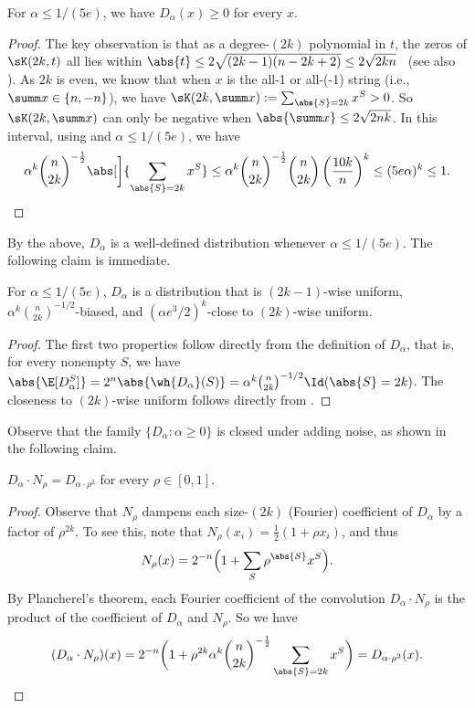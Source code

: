 \begin{claim} \label{claim:krawtchouk-even}
For $\alpha \le 1/(5e)$, we have $D_\alpha(x) \ge 0$ for every $x$.
\end{claim}

\begin{proof}
The key observation is that as a degree-$(2k)$ polynomial in $t$, the zeros of $\sK(2k, t)$ all lies within $\abs{t} \le 2\sqrt{(2k-1) (n-2k+2)} \le 2\sqrt{2kn}$~\cite{Levenshtein95} (see also \cite[Section~5]{KL01}).
As $2k$ is even, we know that when $x$ is the all-1 or all-(-1) string (i.e., $\summ x \in \{n,-n\}$), we have $\sK(2k, \summ x) := \sum_{\abs{S}=2k} x^S > 0$.
So $\sK(2k,\summ x)$ can only be negative when $\abs{\summ x} \le 2\sqrt{2nk}$.
In this interval, using  and $\alpha \le 1/(5e)$, we have
\[
  \alpha^k \binom{n}{2k}^{-\frac{1}{2}} \abs[\bigg]{\sum_{\abs{S}=2k} x^S}
  \le \alpha^k \binom{n}{2k}^{-\frac{1}{2}} \binom{n}{2k} \left(\frac{10k}{n}\right)^k
  \le (5e\alpha)^k \le 1 . \qedhere \]
\end{proof}

By the above, $D_\alpha$ is a well-defined distribution whenever $\alpha \le 1/(5e)$.
The following claim is immediate.

\begin{claim}
For $\alpha \le 1/(5e)$, $D_\alpha$ is a distribution that is $(2k-1)$-wise uniform, $\alpha^k \binom{n}{2k}^{-1/2}$-biased, and $(\alpha e^3/2)^k$-close to $(2k)$-wise uniform.
\end{claim}
\begin{proof}
  The first two properties follow directly from the definition of $D_\alpha$, that is, for every nonempty $S$, we have $\abs{\E[D_\alpha^S]} = 2^n\abs{\wh{D_\alpha}(S)} = \alpha^k \binom{n}{2k}^{-1/2} \Id(\abs{S}=2k)$.
  The closeness to $(2k)$-wise uniform follows directly from .
\end{proof}

Observe that the family $\{D_\alpha: \alpha \ge 0\}$ is closed under adding noise, as shown in the following claim.

\begin{claim} \label{claim:noise-invariant}
  $D_\alpha \cdot N_\rho = D_{\alpha \cdot \rho^2}$ for every $\rho \in [0,1]$. 
\end{claim}

\begin{proof}
  Observe that $N_\rho$ dampens each size-$(2k)$ (Fourier) coefficient of $D_\alpha$ by a factor of $\rho^{2k}$.
  To see this, note that $N_\rho(x_i) = \frac{1}{2}(1 + \rho x_i)$, and thus
  \[
    N_\rho(x) = 2^{-n} \Bigl( 1 + \sum_S \rho^{\abs{S}} x^S  \Bigr) .
  \]
  By Plancherel's theorem, each Fourier coefficient of the convolution $D_\alpha \cdot N_\rho$ is the product of the coefficient of $D_\alpha$ and $N_\rho$.
  So we have
  \[
    (D_\alpha \cdot N_\rho)(x)
    = 2^{-n} \biggl(  1 + \rho^{2k} \alpha^k \binom{n}{2k}^{-\frac{1}{2}} \sum_{\abs{S}=2k} x^S \biggr)
    =D_{\alpha \cdot \rho^2}(x) . \qedhere
  \]
\end{proof}

